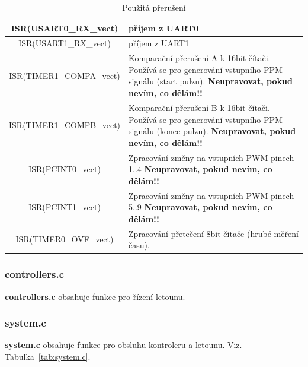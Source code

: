 \documentclass[11pt, a4paper]{article}
\begin{document}
\begin{table}
\begin{center}
\begin{tabular}{| c | p{8cm} |}
\hline
ISR(USART0\_RX\_vect) & příjem z UART0 \\
\hline
ISR(USART1\_RX\_vect) & příjem z UART1 \\
\hline
ISR(TIMER1\_COMPA\_vect) & Komparační přerušení A k 16bit čítači. Používá se pro generování vstupního PPM signálu (start pulzu).
\newline \textbf{Neupravovat, pokud nevím, co dělám!!}\\
\hline
ISR(TIMER1\_COMPB\_vect) & Komparační přerušení B k 16bit čítači. Používá se pro generování vstupního PPM signálu (konec pulzu).
\newline \textbf{Neupravovat, pokud nevím, co dělám!!}\\
\hline
ISR(PCINT0\_vect) & Zpracování změny na vstupních PWM pinech 1..4
\newline \textbf{Neupravovat, pokud nevím, co dělám!!}\\
\hline
ISR(PCINT1\_vect) & Zpracování změny na vstupních PWM pinech 5..9
\newline \textbf{Neupravovat, pokud nevím, co dělám!!}\\
\hline
ISR(TIMER0\_OVF\_vect) & Zpracování přetečení 8bit čitače (hrubé měření času). \\
\hline
\end{tabular}
\caption{Použitá přerušení}
\label{tab:interrupts}
\end{center}
\end{table}

\subsubsection{controllers.c}\label{cap:controllers}

\textbf{controllers.c} obsahuje funkce pro řízení letounu.

\subsubsection{system.c}

\textbf{system.c} obsahuje funkce pro obsluhu kontroleru a letounu. Viz. Tabulka~\ref{tab:system.c}.
\end{document}
